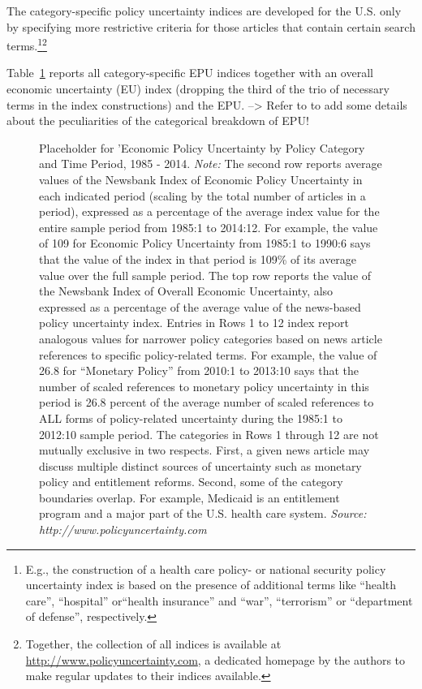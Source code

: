 \documentclass[a4paper,11pt,listof=nochaptergap,oneside,pointednumbers,bibtotoc,bigheadings,liststotoc]{scrbook}
\begin{document}
The category-specific policy uncertainty indices are developed for the U.S. only by specifying more restrictive criteria for those articles that contain certain search terms.\footnote{E.g., the construction of a health care policy- or national security policy uncertainty index is based on the presence of additional terms like ``health care'', ``hospital'' or``health insurance'' and ``war'', ``terrorism'' or ``department of defense'', respectively.}\footnote{Together, the collection of all indices is available at \url{http://www.policyuncertainty.com}, a dedicated homepage by the authors to make regular updates to their indices available.}

Table~\ref{fig:epuindex_categories} reports all category-specific EPU indices together with an overall economic uncertainty (EU) index (dropping the third of the trio of necessary terms in the index constructions) and the EPU. --> Refer to \citet[p. 1602]{bakeretal:15} to add some details about the peculiarities of the categorical breakdown of EPU!


 \begin{figure}[!h]
   \centering
   \setlength\fboxsep{0pt}
   \setlength\fboxrule{0pt}
      \caption[Placeholder for 'Economic Policy Uncertainty by Policy Category and Time Period, 1985 - 2014.]{Placeholder for 'Economic Policy Uncertainty by Policy Category and Time Period, 1985 - 2014.
      \textit{Note:} The second row reports average values of the Newsbank Index of Economic Policy Uncertainty in each indicated period (scaling by the total number of articles in a period), expressed as a percentage of the average index value for the entire sample period from 1985:1 to 2014:12. For example, the value of 109 for Economic Policy Uncertainty from 1985:1 to 1990:6 says that the value of the index in that period is 109\% of its average value over the full sample period. The top row reports the value of the Newsbank Index of Overall Economic Uncertainty, also expressed as a percentage of the average value of the news-based policy uncertainty index. Entries in Rows 1 to 12 index report analogous values for narrower policy categories based on news article references to specific policy-related terms. For example, the value of 26.8 for “Monetary Policy” from 2010:1 to 2013:10 says that the number of scaled references to monetary policy uncertainty in this period is 26.8 percent of the
average number of scaled references to ALL forms of policy-related uncertainty during the 1985:1 to 2012:10 sample period. The categories in Rows 1 through 12 are not mutually exclusive in two respects. First, a given news article may discuss multiple distinct sources of uncertainty such as monetary policy and entitlement reforms. Second, some of the category boundaries overlap. For example, Medicaid is an entitlement program and a major part of the U.S. health care system. \textit{Source: http://www.policyuncertainty.com}}   \label{fig:epuindex_categories}
\end{figure}
\end{document}
